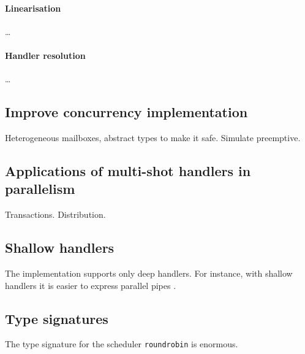 \documentclass[12pt,mscres,cdtppar,twoside,openright,logo,rightchapter,normalheadings]{infthesis}
\theoremstyle{definition}
\begin{document}
\paragraph{Linearisation} \dots

\paragraph{Handler resolution} \dots

\subsection{Improve concurrency implementation}
Heterogeneous mailboxes, abstract types to make it safe. Simulate
preemptive.

\subsection{Applications of multi-shot handlers in parallelism}
Transactions. Distribution.

\subsection{Shallow handlers}
The implementation supports only deep handlers. For instance, with
shallow handlers it is easier to express parallel pipes
\citep{Kammar2013}.

\subsection{Type signatures}
The type signature for the scheduler \lstinline$roundrobin$ is
enormous.



%

\singlespace



\end{document}
